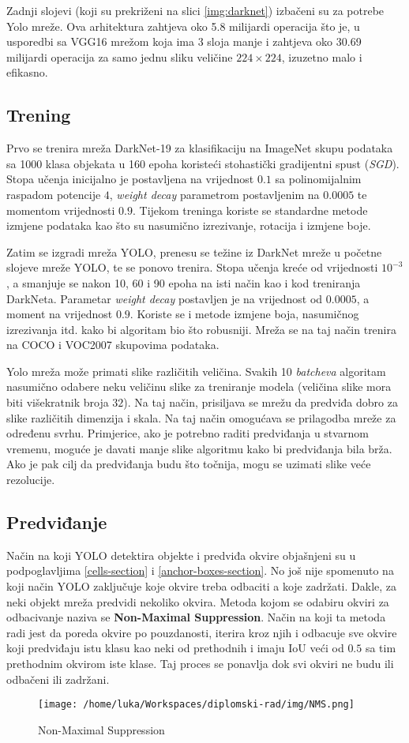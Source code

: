 Zadnji slojevi (koji su prekriženi na slici \ref{img:darknet}) izbačeni su za potrebe Yolo mreže. Ova arhitektura zahtjeva oko 5.8 milijardi operacija što je, u usporedbi sa VGG16 mrežom koja ima 3 sloja manje i zahtjeva oko 30.69 milijardi operacija za samo jednu sliku veličine $224 \times 224$, izuzetno malo i efikasno.

\subsection{Trening}

Prvo se trenira mreža DarkNet-19 za klasifikaciju na ImageNet skupu podataka sa 1000 klasa objekata u 160 epoha koristeći stohastički gradijentni spust (\textit{SGD}). Stopa učenja inicijalno je postavljena na vrijednost $0.1$ sa polinomijalnim raspadom potencije $4$, \textit{weight decay} parametrom postavljenim na $0.0005$ te momentom vrijednosti $0.9$. Tijekom treninga koriste se standardne metode izmjene podataka kao što su nasumično izrezivanje, rotacija i izmjene boje.

Zatim se izgradi mreža YOLO, prenesu se težine iz DarkNet mreže u početne slojeve mreže YOLO, te se ponovo trenira. Stopa učenja kreće od vrijednosti $10^{-3}$, a smanjuje se nakon 10, 60 i 90 epoha na isti način kao i kod treniranja DarkNeta. Parametar \textit{weight decay} postavljen je na vrijednost od $0.0005$, a moment na vrijednost $0.9$. Koriste se i metode izmjene boja, nasumičnog izrezivanja itd. kako bi algoritam bio što robusniji. Mreža se na taj način trenira na COCO i VOC2007 skupovima podataka.

Yolo mreža može primati slike različitih veličina. Svakih 10 \textit{batcheva} algoritam nasumično odabere neku veličinu slike za treniranje modela (veličina slike mora biti višekratnik broja $32$). Na taj način, prisiljava se mrežu da predviđa dobro za slike različitih dimenzija i skala. Na taj način omogućava se prilagodba mreže za određenu svrhu. Primjerice, ako je potrebno raditi predviđanja u stvarnom vremenu, moguće je davati manje slike algoritmu kako bi predviđanja bila brža. Ako je pak cilj da predviđanja budu što točnija, mogu se uzimati slike veće rezolucije.

\subsection{Predviđanje}

Način na koji YOLO detektira objekte i predviđa okvire objašnjeni su u podpoglavljima \ref{cells-section} i \ref{anchor-boxes-section}. No još nije spomenuto na koji način YOLO zaključuje koje okvire treba odbaciti a koje zadržati. Dakle, za neki objekt mreža predvidi nekoliko okvira. Metoda kojom se odabiru okviri za odbacivanje naziva se \textbf{Non-Maximal Suppression}. Način na koji ta metoda radi jest da poreda okvire po pouzdanosti, iterira kroz njih i odbacuje sve okvire koji predviđaju istu klasu kao neki od prethodnih i imaju IoU veći od $0.5$ sa tim prethodnim okvirom iste klase. Taj proces se ponavlja dok svi okviri ne budu ili odbačeni ili zadržani.

\begin{figure}[htp]
	\centering
	\texttt{[image: /home/luka/Workspaces/diplomski-rad/img/NMS.png]}
	\caption{Non-Maximal Suppression}
	\label{img:nms}
\end{figure}